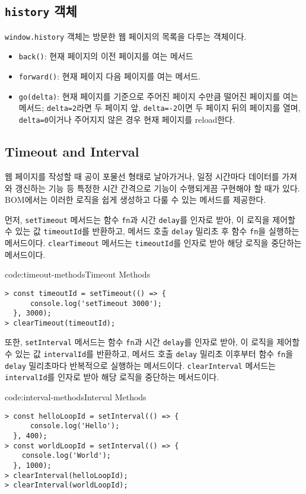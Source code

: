 \subsection*{\texttt{history} 객체}

\texttt{window.history} 객체는 방문한 웹 페이지의 목록을 다루는 객체이다.

\begin{itemize}
    \item \texttt{back()}: 현재 페이지의 이전 페이지를 여는 메서드
    \item \texttt{forward()}: 현재 페이지 다음 페이지를 여는 메서드. 
    \item \texttt{go(delta)}: 현재 페이지를 기준으로 주어진 페이지 수만큼 떨어진 페이지를 여는 메서드; \texttt{delta=2}라면 두 페이지 앞, \texttt{delta=-2}이면 두 페이지 뒤의 페이지를 열며, \texttt{delta=0}이거나 주어지지 않은 경우 현재 페이지를 reload한다.
\end{itemize}

\subsection*{Timeout and Interval}

웹 페이지를 작성할 때 공이 포물선 형태로 날아가거나, 일정 시간마다 데이터를 가져와 갱신하는 기능 등 특정한 시간 간격으로 기능이 수행되게끔 구현해야 할 때가 있다. BOM에서는 이러한 로직을 쉽게 생성하고 다룰 수 있는 메서드를 제공한다.

먼저, \texttt{setTimeout} 메서드는 함수 \texttt{fn}과 시간 \texttt{delay}를 인자로 받아, 이 로직을 제어할 수 있는 값 \texttt{timeoutId}를 반환하고, 메서드 호출 \texttt{delay} 밀리초 후 함수 \texttt{fn}을 실행하는 메서드이다. \texttt{clearTimeout} 메서드는 \texttt{timeoutId}를 인자로 받아 해당 로직을 중단하는 메서드이다.

\begin{codeenv}{code:timeout-methods}{Timeout Methods}\begin{verbatim}
> const timeoutId = setTimeout(() => {
      console.log('setTimeout 3000');
  }, 3000);
> clearTimeout(timeoutId);
\end{verbatim}
\end{codeenv}

또한, \texttt{setInterval} 메서드는 함수 \texttt{fn}과 시간 \texttt{delay}를 인자로 받아, 이 로직을 제어할 수 있는 값 \texttt{intervalId}를 반환하고, 메서드 호출 \texttt{delay} 밀리초 이후부터 함수 \texttt{fn}을 \texttt{delay} 밀리초마다 반복적으로 실행하는 메서드이다. \texttt{clearInterval} 메서드는 \texttt{intervalId}를 인자로 받아 해당 로직을 중단하는 메서드이다.

\begin{codeenv}{code:interval-methods}{Interval Methods}\begin{verbatim}
> const helloLoopId = setInterval(() => {
      console.log('Hello');
  }, 400);
> const worldLoopId = setInterval(() => {
    console.log('World');
  }, 1000);
> clearInterval(helloLoopId);
> clearInterval(worldLoopId);
\end{verbatim}
\end{codeenv}
